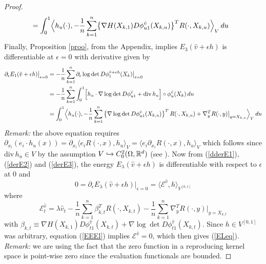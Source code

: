\documentclass[noinfoline]{imsart}
\begin{document}
\begin{proof}
\begin{align}
&=  \int_0^1\Bigl\langle  h_u(\cdot),  -\frac{1}{n}\sum_{k=1}^n \bigl\{ \nabla H( X_{k,1}) D\phi^{\hat v}_{u1}(X_{k,u}) \bigr\}^T R(\cdot,X_{k,u})\Bigr\rangle_V \,du  \label{derE2}
\end{align}
Finally, Proposition \ref{proo}, from the Appendix, implies $E_3(\hat v+\epsilon h )$ is differentiable at $\epsilon = 0$ with derivative given by  
\begin{align}
\partial_\epsilon  E_1(\hat v+\epsilon h)\bigr|_{\epsilon=0} \nonumber
&  =- \frac{1}{n} \sum_{k=1}^n  \partial_\epsilon  \log \det D\phi_{1}^{\hat v+\epsilon h }(X_k)\bigr|_{\epsilon = 0} \nonumber\\
&=- \frac{1}{n} \sum_{k=1}^n   
 \int_0^1  \Bigl[ h_u \cdot \nabla \log\det D\phi_{u1}^{\hat v}  + \text{\rm div}\, h_u\Bigr] \circ  \phi^{\hat v}_{u}(X_k)  \, du \nonumber\\
&= \int_0^1 \Bigl\langle h_u(\cdot), - \frac{1}{n} \sum_{k=1}^n \left\{ \nabla \log\det D\phi_{u1}^{\hat v}(X_{k,u})\right\}^T  R(\cdot,X_{k,u})+\nabla_{y}^T R(\cdot,y)\bigr|_{y=X_{k,u}}\Bigr\rangle_V \,du \label{derE3} 
\end{align}
{\em Remark:} the above equation requires $\partial_{x_i } ( e_i\cdot h_u(x))  = \partial_{x_i}   \langle e_i R(\cdot, x),  h_u\rangle_V=  \langle e_i  \partial_{x_i} R(\cdot, x),  h_u\rangle_V$ which follows since $\text{div}\, h_u \in V$ by the assumption $V\hookrightarrow C_0^2(\Omega,\Bbb R^d)$ (see \cite{aro:50}).
Now from (\ref{dderE1}),  (\ref{derE2}) and (\ref{derE3}), the energy $ E_\lambda(\hat v+\epsilon h)$ is differentiable with respect to $\epsilon$ at $0$ and
\begin{equation}
\label{EEEl}
0={\partial_\epsilon}  E_\lambda(\hat v+\epsilon h)\bigr|_{\epsilon=0}= \langle \mathcal E ^{\hat v},h \rangle_{V^{[0,1]}}
\end{equation}
where
\begin{equation}
\label{CalE}
 \mathcal E ^{\hat v}_t =\lambda \hat v_t   - \frac{1}{n}\sum_{k=1}^n \beta^T_{k,t}  R(\cdot,X_{k,t})  - \frac{1}{n}\sum_{k=1}^n \nabla_{y}^T R(\cdot,y)\bigr|_{y=X_{k,t}}
 \end{equation}
with $\beta_{k,t}\equiv  \nabla H( X_{k,1}) D\phi^{\hat v}_{t1}(X_{k,t})  + \nabla \log\det D\phi_{t1}^{\hat v}(X_{k,t}) $.
Since $h\in V^{[0,1]}$ was arbitrary, equation (\ref{EEEl}) implies $\mathcal E^{\hat v}=0$, which then gives (\ref{ELeq}). {\em Remark:} we are using the fact that the zero function in a reproducing kernel space is point-wise zero since the evaluation functionals are bounded. 
\end{proof}
\end{document}
